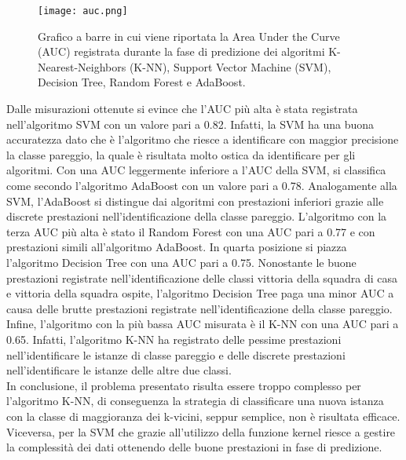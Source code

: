 \begin{figure}[h]
	\begin{center}
		\texttt{[image: auc.png]}
		\caption{Grafico a barre in cui viene riportata la Area Under the Curve (AUC) registrata durante la fase di predizione dei algoritmi K-Nearest-Neighbors (K-NN),  Support Vector Machine (SVM), Decision Tree, Random Forest e AdaBoost.  
		} 
		\label{fig:auc}
	\end{center}
\end{figure}
Dalle misurazioni ottenute si evince che l'AUC più alta è stata registrata nell'algoritmo SVM con un valore pari a 0.82. Infatti, la SVM ha una buona accuratezza dato che è l'algoritmo che riesce a identificare con maggior precisione la classe pareggio, la quale è risultata molto ostica da identificare per gli algoritmi. Con una AUC leggermente inferiore a l'AUC della SVM, si classifica come secondo l'algoritmo AdaBoost con un valore pari a 0.78. Analogamente alla SVM, l'AdaBoost si distingue dai algoritmi con prestazioni inferiori grazie alle discrete prestazioni nell'identificazione della classe pareggio. L'algoritmo con la terza AUC più alta è stato il Random Forest con una AUC pari a 0.77 e con prestazioni simili all'algoritmo AdaBoost.
In quarta posizione si piazza l'algoritmo Decision Tree con una AUC pari a 0.75. Nonostante le buone prestazioni registrate nell'identificazione delle classi vittoria della squadra di casa e vittoria della squadra ospite, l'algoritmo Decision Tree paga una minor AUC a causa delle brutte prestazioni registrate nell'identificazione della classe pareggio. Infine, l'algoritmo con la più bassa AUC misurata è il K-NN con una AUC pari a 0.65. Infatti, l'algoritmo K-NN ha registrato delle pessime prestazioni nell'identificare le istanze di classe pareggio e delle discrete prestazioni nell'identificare le istanze delle altre due classi.\\
In conclusione, il problema presentato risulta essere troppo complesso per l'algoritmo K-NN, di conseguenza la strategia di classificare una nuova istanza con la classe di maggioranza dei k-vicini, seppur semplice, non è risultata efficace. Viceversa, per la SVM che grazie all'utilizzo della funzione kernel riesce a gestire la complessità dei dati ottenendo delle buone prestazioni in fase di predizione.
